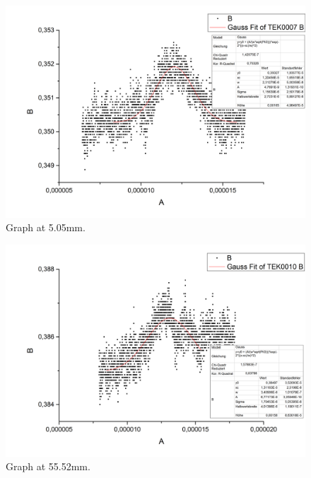 \begin{figure}[h]
\begin{center}
\includegraphics[scale=0.25]{Bilder/Teil2/Graph7}
\caption{Graph at 5.05mm.}
\label{fig:graph7}
\end{center}
\end{figure}
\begin{figure}[h]
\begin{center}
\includegraphics[scale=0.25]{Bilder/Teil2/Graph8}
\caption{Graph at 55.52mm.}
\label{fig:graph8}
\end{center}
\end{figure}
